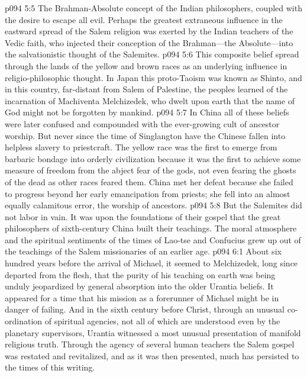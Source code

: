 \pc \vs p094 5:5 \bibnobreakspace The Brahman\hyp{}Absolute concept of the Indian philosophers, coupled with the desire to escape all evil. Perhaps the greatest extraneous influence in the eastward spread of the Salem religion was exerted by the Indian teachers of the Vedic faith, who injected their conception of the Brahman---the Absolute---into the salvationistic thought of the Salemites.
\pc \vs p094 5:6 This composite belief spread through the lands of the yellow and brown races as an underlying influence in religio\hyp{}philosophic thought. In Japan this proto\hyp{}Taoism was known as Shinto, and in this country, far\hyp{}distant from Salem of Palestine, the peoples learned of the incarnation of Machiventa Melchizedek, who dwelt upon earth that the name of God might not be forgotten by mankind.
\vs p094 5:7 In China all of these beliefs were later confused and compounded with the ever\hyp{}growing cult of ancestor worship. But never since the time of Singlangton have the Chinese fallen into helpless slavery to priestcraft. The yellow race was the first to emerge from barbaric bondage into orderly civilization because it was the first to achieve some measure of freedom from the abject fear of the gods, not even fearing the ghosts of the dead as other races feared them. China met her defeat because she failed to progress beyond her early emancipation from priests; she fell into an almost equally calamitous error, the worship of ancestors.
\pc \vs p094 5:8 But the Salemites did not labor in vain. It was upon the foundations of their gospel that the great philosophers of sixth\hyp{}century China built their teachings. The moral atmosphere and the spiritual sentiments of the times of Lao\hyp{}tse and Confucius grew up out of the teachings of the Salem missionaries of an earlier age.
\vs p094 6:1 About six hundred years before the arrival of Michael, it seemed to Melchizedek, long since departed from the flesh, that the purity of his teaching on earth was being unduly jeopardized by general absorption into the older Urantia beliefs. It appeared for a time that his mission as a forerunner of Michael might be in danger of failing. And in the sixth century before Christ, through an unusual co\hyp{}ordination of spiritual agencies, not all of which are understood even by the planetary supervisors, Urantia witnessed a most unusual presentation of manifold religious truth. Through the agency of several human teachers the Salem gospel was restated and revitalized, and as it was then presented, much has persisted to the times of this writing.
